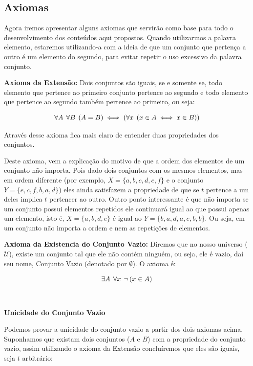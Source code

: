 \subsection{Axiomas}
Agora iremos apresentar alguns axiomas que servirão como base para todo o desenvolvimento dos conteúdos aqui propostos. Quando utilizarmos a palavra elemento, estaremos utilizando-a com a ideia de que um conjunto que pertença a outro é um elemento do segundo, para evitar repetir o uso excessivo da palavra conjunto.

\textbf{Axioma da Extensão:} Dois conjuntos são iguais, se e somente se, todo elemento que pertence ao primeiro conjunto pertence ao segundo e todo elemento que pertence ao segundo também pertence ao primeiro, ou seja:

\[\forall A \hspace{1.5mm} \forall B \hspace{1.5mm} (A = B) \iff (\forall x \hspace{1.5mm} (x \in A \iff x \in B))\]

Através desse axioma fica mais claro de entender duas propriedades dos conjuntos.

Deste axioma, vem a explicação do motivo de que a ordem dos elementos de um conjunto não importa. Pois dado dois conjuntos com os mesmos elementos, mas em ordem diferente (por exemplo, $X=\{a,b,c,d,e,f\}$ e o conjunto $Y=\{e,c,f,b,a,d\}$) eles ainda satisfazem a propriedade de que se $t$ pertence a um deles implica $t$ pertencer ao outro. Outro ponto interessante é que não importa se um conjunto possui elementos repetidos ele continuará igual ao que possui apenas um elemento, isto é, $X=\{a,b,d,e\}$ é igual ao $Y=\{b,a,d,a,e,b,b\}$. Ou seja, em um conjunto não importa a ordem e nem as repetições de elementos.

\textbf{Axioma da Existencia do Conjunto Vazio:} Diremos que no nosso universo ($\mathcal{U}$), existe um conjunto tal que ele não contém ninguém, ou seja, ele é vazio, daí seu nome, Conjunto Vazio (denotado por $\emptyset$). O axioma é:

\[\exists A \hspace{1.5mm} \forall x \hspace{1.5mm} \neg\hspace{0.5mm} (x \in A)\]

$\qquad$

\textbf{Unicidade do Conjunto Vazio}

Podemos provar a unicidade do conjunto vazio a partir dos dois axiomas acima. Suponhamos que existam dois conjuntos ($A$ e $B$) com a propriedade do conjunto vazio, assim utilizando o axioma da Extensão concluíremos que eles são iguais, seja $t$ arbitrário:

